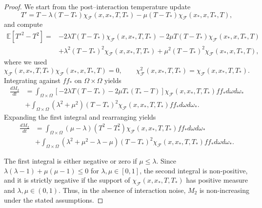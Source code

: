 \documentclass[10pt,a4paper]{amsart}
\begin{document}
\begin{proof}
We start from the post–interaction temperature update
\[
T' = T - \lambda (T - T_*)\chi_\mathcal{F}(x,x_*,T,T_*) - \mu (T - T_*)\chi_\mathcal{F}(x_*,x,T_*,T),
\]
and compute
\[
\begin{split}
\mathbb{E}[T'^2 - T^2]
= &-2\lambda T(T-T_*)\chi_\mathcal{F}(x,x_*,T,T_*) 
  -2\mu T(T-T_*)\chi_\mathcal{F}(x_*,x,T_*,T)\\
  &+ \lambda^2 (T-T_*)^2\chi_\mathcal{F}(x,x_*,T,T_*) 
  + \mu^2 (T-T_*)^2\chi_\mathcal{F}(x_*,x,T_*,T),
  \end{split}
\]
where we used  
\[
\chi_\mathcal{F}(x,x_*,T,T_*)\chi_\mathcal{F}(x_*,x,T_*,T)=0,\qquad \chi^2_\mathcal{F}(x,x_*,T,T_*)=\chi_\mathcal{F}(x,x_*,T,T_*).
\]
Integrating against $ff_*$ on $\Omega\times\Omega$ yields
\begin{equation*}
\begin{split}
\frac{dM_2}{dt}&=\int_{\Omega\times\Omega}\left[-2\lambda T(T-T_*)-2\mu T_*(T_*-T)\right]\chi_\mathcal{F}(x,x_*,T,T_*)ff_*d\omega d\omega_*\\
&+\int_{\Omega\times\Omega}(\lambda^2+\mu^2)(T-T_*)^2\chi_\mathcal{F}(x,x_*,T,T_*)ff_*d\omega d\omega_*.
\end{split}
\end{equation*}
Expanding the first integral and rearranging yields
 \begin{equation*}
\begin{split}
\frac{dM_2}{dt}&=\int_{\Omega\times\Omega}(\mu-\lambda)(T^2-T_*^2)\chi_\mathcal{F}(x,x_*,T,T_*)ff_*d\omega d\omega_*\\
&+\int_{\Omega\times\Omega}(\lambda^2+\mu^2-\lambda-\mu)(T-T_*)^2\chi_\mathcal{F}(x,x_*,T,T_*)ff_*d\omega d\omega_*.
\end{split}
\end{equation*}

The first integral is either negative or zero if $\mu\leq\lambda$. Since $\lambda(\lambda-1)+\mu(\mu-1)\leq 0$ for $\lambda,\mu\in[0,1]$, the second integral is non-positive, and it is strictly negative if the support of
$\chi_\mathcal{F}(x,x_*,T,T_*)$ has positive measure and $\lambda,\mu\in(0,1)$.
Thus, in the absence of interaction noise, \(M_2\) is non-increasing under the
stated assumptions. 
\end{proof}
\end{document}
